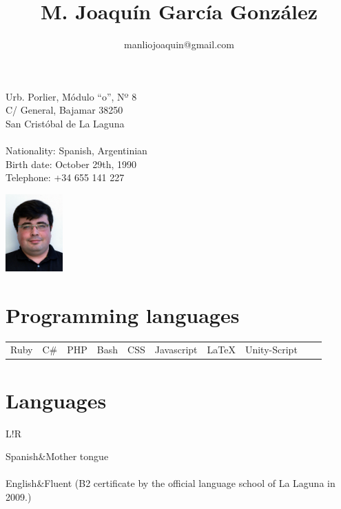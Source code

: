 \documentclass[10pt]{article}
\title{\bfseries M. Joaquín García González}
\author{manliojoaquin@gmail.com}
\date{}
\newcommand\VRule{\color{lightgray}\vrule width 0.5pt}
\begin{document}

    \maketitle

    \vspace{4em}

    \begin{minipage}[ht]{0.48\textwidth}
        Urb. Porlier, Módulo ``o'', Nº 8\\
        C/ General, Bajamar 38250\\
        San Cristóbal de La Laguna\\
        \\
        Nationality: Spanish, Argentinian\\
        Birth date: October 29th, 1990\\
        Telephone: +34 655 141 227
    \end{minipage}
    \begin{minipage}[ht]{0.48\textwidth}
        \begin{flushright}
        \includegraphics[height=8em]{profile}
        \end{flushright}
    \end{minipage}

    \vspace{4em}

    \section*{Programming languages}
    \begin{center}
    \begin{tabular}{ c c c c c c c c c c }

        Ruby & C\# & PHP & Bash & CSS & Javascript & \LaTeX & Unity-Script

    \end{tabular}
    \end{center}

    \section*{Languages}
    \begin{tabular}{L!{\VRule}R}

        Spanish&Mother tongue\\\\

        English&Fluent (B2 certificate by the official language school of La Laguna in 2009.)\\\\

    \end{tabular}
\end{document}

